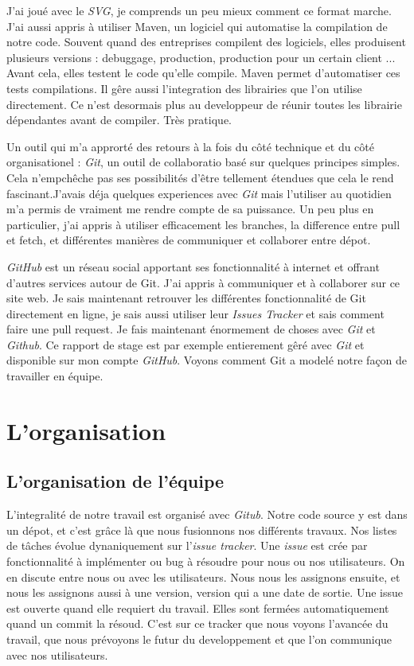 J'ai joué avec le \textit{SVG}, je comprends un peu mieux comment ce format marche. J'ai aussi appris à utiliser Maven, un logiciel qui automatise la compilation de notre code. Souvent quand des entreprises compilent des logiciels, elles produisent plusieurs versions : debuggage, production, production pour un certain client ... Avant cela, elles testent le code qu'elle compile. Maven permet d'automatiser ces tests compilations. Il gêre aussi l'integration des librairies que l'on utilise directement. Ce n'est desormais plus au developpeur de réunir toutes les librairie dépendantes avant de compiler. Très pratique. 

Un outil qui m'a approrté des retours à la fois du côté technique et du côté organisationel : \textit{Git}, un outil de collaboratio  basé sur quelques principes simples. Cela n'empchêche pas ses possibilités d'être tellement étendues que cela le rend fascinant.J'avais déja quelques experiences avec \textit{Git} mais l'utiliser au quotidien m'a permis de vraiment me rendre compte de sa puissance. Un peu plus en particulier, j'ai appris à utiliser efficacement les branches, la difference entre pull et fetch, et différentes manières de communiquer et collaborer entre dépot.

\textit{GitHub} est un réseau social apportant ses fonctionnalité à internet et offrant d'autres services autour de Git. J'ai appris à communiquer et à collaborer sur ce site web. Je sais maintenant retrouver les différentes fonctionnalité de Git directement en ligne, je sais aussi utiliser leur \textit{Issues Tracker} et sais comment faire une pull request. Je fais maintenant énormement de choses avec \textit{Git} et \textit{Github}. Ce rapport de stage est par exemple entierement gêré avec \textit{Git} et disponible sur mon compte \textit{GitHub}.
Voyons comment Git a modelé notre façon de travailler en équipe.


\section{L'organisation}

\subsection{L'organisation de l'équipe}
L'integralité de notre travail est organisé avec \textit{Gitub}. Notre code source y est dans un dépot, et c'est grâce là que nous fusionnons nos différents travaux. Nos listes de tâches évolue dynaniquement sur l'\textit{issue tracker}. Une \textit{issue} est crée par fonctionnalité à implémenter ou bug à résoudre pour nous ou nos utilisateurs. On en discute entre nous ou avec les utilisateurs. Nous nous les assignons ensuite, et nous les assignons aussi à une version, version qui a une date de sortie. Une issue est ouverte quand elle requiert du travail. Elles sont fermées automatiquement quand un commit la résoud. C'est sur ce tracker que nous voyons l'avancée du travail, que nous prévoyons le futur du developpement et que l'on communique avec nos utilisateurs.

